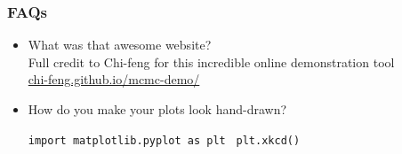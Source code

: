 \documentclass[aspectratio=169]{beamer}
\begin{document}

\begin{frame}
    \frametitle{FAQs}
    
    \begin{itemize}
    \item What was that awesome website? \\
    \hfill Full credit to Chi-feng for this incredible online demonstration tool\\
    \hfill \href{https://chi-feng.github.io/mcmc-demo/}{chi-feng.github.io/mcmc-demo/}

    \item How do you make your plots look hand-drawn? \\
        \vspace{5pt}
        \hfill\parbox{0.5\textwidth}{
            \texttt{import matplotlib.pyplot as plt}
            \texttt{ plt.xkcd()}
        }
    \end{itemize}
\end{frame}
\end{document}
